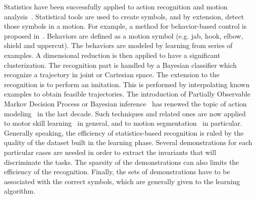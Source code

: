 \documentclass[letterpaper, 10pt, conference]{ieeeconf}      %
\begin{document}
Statistics have been successfully applied
to action recognition and motion analysis~\cite{schaal03}.
Statistical tools are used to create symbols, and by extension, detect those
symbols in a motion. For example, a method for behavior-based control 
is proposed in~\cite{drumwright03, drumwright04}. Behaviors are defined 
as a motion symbol (e.g. jab, hook, elbow, shield and uppercut). 
The behaviors are modeled by learning from series of examples.
A dimensional reduction is then applied to have a significant
clusterization.  The recognition part is handled by a Bayesian classifier which
recognize a trajectory in joint or Cartesian space. The extension to the recognition
is to perform an imitation. This is performed by interpolating known examples to obtain
feasible trajectories. The introduction of Partially
Observable Markov Decision Process or Bayesian inference~\cite{pearl88} has
renewed the topic of action modeling~\cite{kaelbling98} in the last decade. Such
techniques and related ones are now applied to motor skill learning~\cite{peters08} in
general, and to motion segmentation~\cite{calinon10, inamura04} in particular. 
Generally speaking, the efficiency of statistics-based recognition is ruled by the quality of the dataset built
in the learning phase.
Several demonstrations for each particular cases are needed in order to extract
the invariants that will discriminate the tasks. The sparsity of the demonstrations
can also limits the efficiency of the recognition. Finally, the sets of demonstrations
have to be associated with the correct symbols, which are generally given to the learning algorithm.
\end{document}
